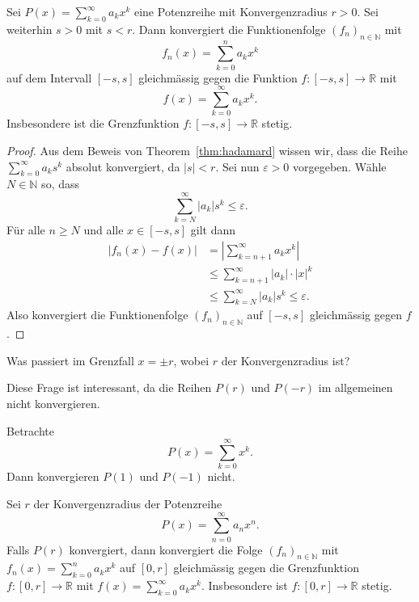 \documentclass[../main.tex]{subfiles}
\begin{document}
\begin{proposition}\label{prop:power-series-uniform}
  Sei 
  \(
    P(x) = \sum_{k=0}^{\infty} a_k x^k
  \)
  eine Potenzreihe mit Konvergenzradius $r > 0$.
  Sei weiterhin $s > 0$ mit $s < r$.
  Dann konvergiert die Funktionenfolge ${(f_{n})}_{n \in \mathbb{N}}$ mit
  \[
    f_n(x) = \sum_{k=0}^{n} a_k x^k
  \]
  auf dem Intervall $[-s, s]$ gleichmässig gegen die Funktion
  $f \colon [-s, s] \to \mathbb{R}$ mit
  \[
    f(x) = \sum_{k=0}^{\infty} a_k x^k.
  \]
  Insbesondere ist die Grenzfunktion $f \colon [-s, s] \to \mathbb{R}$ stetig.
\end{proposition}


\begin{proof}
  Aus dem Beweis von Theorem~\ref{thm:hadamard} wissen wir, dass die Reihe
  \(
    \sum_{k=0}^{\infty} a_k s^k
  \)
  absolut konvergiert, da $|s| < r$.
  Sei nun $\varepsilon > 0$ vorgegeben.
  Wähle $N \in \mathbb{N}$ so, dass
  \[
    \sum_{k=N}^{\infty} |a_k| s^k \leq \varepsilon.
  \]
  Für alle $n \geq N$ und alle $x \in [-s, s]$ gilt dann
   \begin{align*}
     |f_n(x) - f(x)|
     & = \left| \sum_{k=n+1}^{\infty} a_k x^k \right|\\
     & \leq \sum_{k=n+1}^{\infty} |a_k| \cdot |x|^k\\
     & \leq \sum_{k=N}^{\infty} |a_k| s^k \leq \varepsilon. 
  \end{align*}
  Also konvergiert die Funktionenfolge ${(f_{n})}_{n \in \mathbb{N}}$ auf $[-s, s]$ 
  gleichmässig gegen $f$.
\end{proof}

\begin{question}
  Was passiert im Grenzfall $x = \pm r$, wobei $r$ der Konvergenzradius ist?
\end{question}

Diese Frage ist interessant, da die Reihen $P(r)$ und $P(-r)$
im allgemeinen nicht konvergieren.

\begin{example}
  Betrachte
  \[
    P(x) = \sum_{k=0}^{\infty} x^k.
  \]
  Dann konvergieren $P(1)$ und $P(-1)$ nicht.
\end{example}


\begin{proposition}\label{prop:abel-grenzwertsatz}
  Sei $r$ der Konvergenzradius der Potenzreihe
  \[
    P(x) = \sum_{n=0}^{\infty} a_n x^n.
  \]
  Falls $P(r)$ konvergiert, dann konvergiert die Folge
  ${(f_{n})}_{n \in \mathbb{N}}$ mit
  \(
    f_n(x) = \sum_{k=0}^{n}  a_k x^k
  \)
  auf $[0, r]$ gleichmässig gegen die Grenzfunktion $f \colon [0, r] \to \mathbb{R}$
  mit
  \(
    f(x) = \sum_{k=0}^{\infty} a_k x^k.
  \)
  Insbesondere ist $f \colon [0, r] \to \mathbb{R}$ stetig.
\end{proposition}
\end{document}
